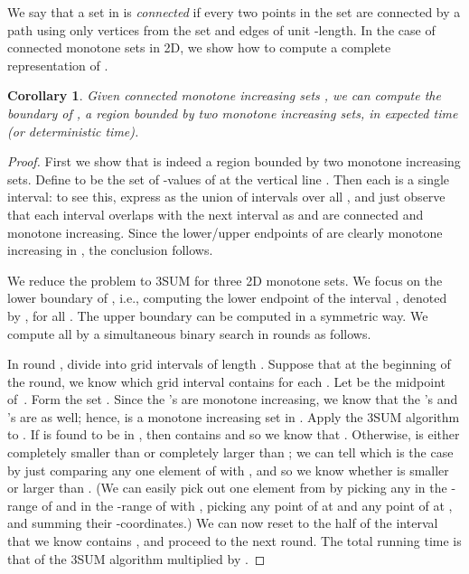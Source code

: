\documentclass[11pt]{article}
\newcommand{\LONG}[1]{#1}\newcommand{\SHORT}[1]{}
\newtheorem{corollary}[theorem]{Corollary}
\begin{document}
\SHORT{
As noted in the full paper,
bounded monotone (min,+) convolution reduces to
3SUM for 2D monotone sets, and is equivalent to
(min,+) convolution in the bounded differences case and
to binary histogram indexing.  Thus, all these
problems can now be solved in  expected time (or
 deterministic time).
}
\LONG{
We say that a set in  is \emph {connected}
if every two points in the set are connected by a path
using only vertices from the set and edges of unit -length.
In the case of connected monotone sets  in 2D, we show how
to compute a complete representation of .

\begin{corollary}\label{cor-monotone-2d}
Given connected monotone increasing sets ,
we can compute the boundary of , a region bounded by
two monotone increasing sets,
in  expected time (or
 deterministic time).
\end{corollary}
\begin{proof}
First we show that  is indeed a region bounded by
two monotone increasing sets.
Define  to be the set of -values of  at
the vertical line .
Then each  is a single interval: to see this,
express  as the union of intervals
 over all , and just observe that
each interval  overlaps with the
next interval  as  and  are connected and monotone increasing.  Since the lower/upper endpoints of  are clearly monotone increasing in , the conclusion follows.

We reduce the problem to 3SUM for three 2D monotone sets.
We focus on the lower boundary of , i.e.,
computing the lower endpoint of the interval , denoted
by , for all .   The upper
boundary can be computed in a symmetric way.
We compute all  by a simultaneous binary search in
 rounds as follows.

In round , divide  into grid intervals of length .  Suppose that at the beginning
of the round, we know which grid interval  contains 
for each .
Let  be the midpoint of~.
Form the set .
Since the 's are monotone increasing, we know that
the 's and 's are as well; hence,  is a
monotone increasing set in .
Apply the 3SUM algorithm to .
If  is found to be in , then
 contains  and so we know that .
Otherwise,  is either completely smaller than  or
completely larger than ; we can tell which is the case
by just comparing any one element of  with , and so we know whether  is smaller or
larger than .  (We can easily
pick out one element from 
by picking any  in the -range of  and  in the -range of  with , picking any point of  at  and any
point of  at , and summing their -coordinates.)
We can now reset  to the
half of the interval that we know contains , and proceed
to the next round.  The total running time is that of the
3SUM algorithm multiplied by .
\end{proof}

}
\end{document}
